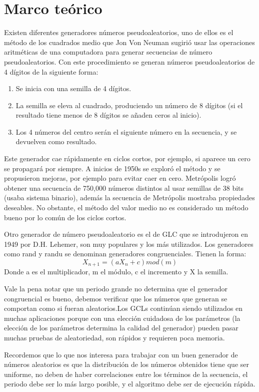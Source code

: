 \section{Marco teórico}
Existen diferentes generadores números pseudoaleatorios, uno de ellos es el método de los cuadrados medio que Jon Von Neuman sugirió usar las operaciones aritméticas de una computadora para generar secuencias de número pseudoaleatorios. Con este procedimiento se generan números pseudoaleatorios de 4 dígitos de la siguiente forma:
\begin{enumerate}
    \item Se inicia con una semilla de 4 dígitos.
    \item La semilla se eleva al cuadrado, produciendo un número de 8 dígitos (si el resultado tiene menos de 8 dígitos se añaden ceros al inicio). 
    \item Los 4 números del centro serán el siguiente número en la secuencia, y se devuelven como resultado. 
\end{enumerate}
Este generador cae rápidamente en ciclos cortos, por ejemplo, si aparece un cero se propagará por siempre.
A inicios de 1950s se exploró el método y se propusieron mejoras, por ejemplo para evitar caer en cero. Metrópolis logró obtener una secuencia de 750,000 números distintos al usar semillas de 38 bits (usaba sistema binario), además la secuencia de Metrópolis mostraba propiedades deseables. No obstante, el método del valor medio no es considerado un método bueno por lo común de los ciclos cortos.

Otro generador de número pseudoaleatorio es el de GLC que se introdujeron en 1949 por D.H. Lehemer, son muy populares y los más utilizados. Los generadores como rand y randu se denominan generadores congruenciales. Tienen la forma:
\begin{equation}
    X_{n+1} = (aX_{n}+c)mod(m)
\end{equation}
Donde a es el multiplicador, m el módulo, c el incremento y X la semilla.

Vale la pena notar que un periodo grande no determina que el generador congruencial es bueno, debemos verificar que los números que generan se comportan como si fueran aleatorios.Los GCLs continúan siendo utilizados en muchas aplicaciones porque con una elección cuidadosa de los parámetros (la elección de los parámetros determina la calidad del generador) pueden pasar muchas pruebas de aleatoriedad, son rápidos y requieren poca memoria.

Recordemos que lo que nos interesa para trabajar con un buen generador de números aleatorios es que la distribución de los números obtenidos tiene que ser uniforme, no deben de haber correlaciones entre los términos de la secuencia, el periodo debe ser lo más largo posible, y el algoritmo debe ser de ejecución rápida.

